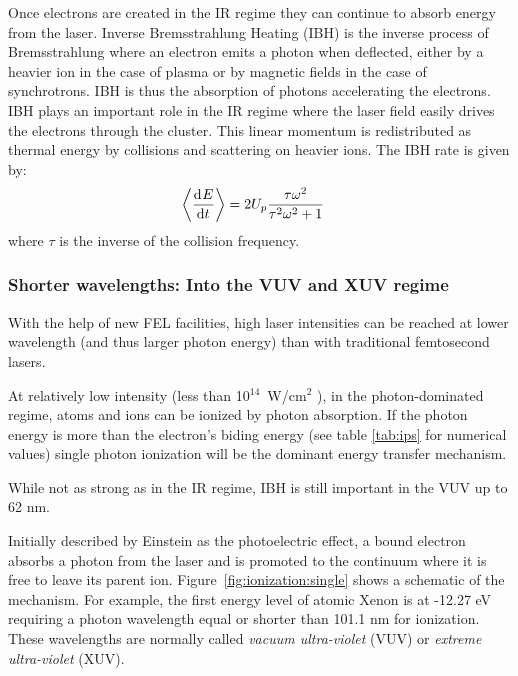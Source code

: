 
Once electrons are created in the IR regime they can continue to absorb energy
from the laser.
Inverse Bremsstrahlung Heating (IBH) is the inverse process of Bremsstrahlung
where an electron emits a photon when deflected, either by a heavier ion in the
case of plasma or by magnetic fields in the case of synchrotrons. IBH is thus
the absorption of photons accelerating the electrons\cite{Schlessinger1979}.
IBH plays an important role in the IR regime where the laser field easily
drives the electrons through the cluster\cite{Fennel2010}. This linear momentum
is redistributed as thermal energy by collisions and scattering on heavier ions.
The IBH rate is given\cite{Fennel2010} by:
\begin{align}
\left< \frac{\textrm{d}^{{}} {E}}{\textrm{d} t^{{}}} \right> & = 2 U_p \frac{\tau \omega^2}{\tau^2 \omega^2 + 1}
\end{align}
where $\tau$ is the inverse of the collision frequency.


\subsubsection{Shorter wavelengths: Into the VUV and XUV regime}
\label{section:intro:mechanisms:vuv}

With the help of new FEL facilities, high laser intensities can be reached at
lower wavelength (and thus larger photon energy) than with traditional
femtosecond lasers.

At relatively low intensity (less than 10$^{14}$~W/cm$^2$
\cite{Ramunno2008}), in the photon-dominated regime, atoms and ions
can be ionized by photon absorption. If the photon energy is more than the
electron's biding energy (see table \ref{tab:ips} for numerical values) single
photon ionization will be the dominant energy transfer mechanism.

While not as strong as in the IR regime, IBH is still important in the
VUV\cite{Krainov2000} up to 62 nm\cite{Georgescu2007}.



Initially described by Einstein as the photoelectric effect, a bound electron
absorbs a photon from the laser and is promoted to the continuum where it is
free to leave its parent ion. Figure~\ref{fig:ionization:single} shows a
schematic of the mechanism. For example, the first energy level of atomic
Xenon is at -12.27 eV requiring a photon wavelength equal or shorter than
101.1 nm for ionization. These wavelengths are normally called
\textit{vacuum ultra-violet} (VUV) or \textit{extreme ultra-violet} (XUV).

